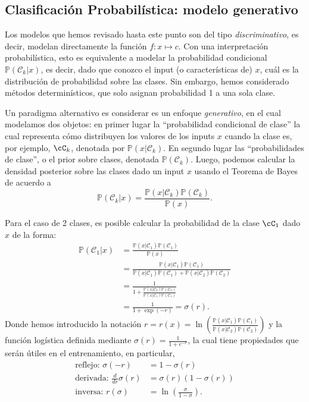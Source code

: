 \subsection{Clasificación Probabilística: modelo generativo}

Los modelos que hemos revisado hasta este punto son del tipo \emph{discriminativo}, es decir, modelan directamente la función $f:x\mapsto c$. Con una interpretación probabilística, esto es equivalente a modelar la probabilidad condicional $\mathbb{P}(\mathcal{C}_k|x)$, es decir, dado que conozco el input (o características de) $x$, cuál es la distribución de probabilidad sobre las clases. Sin embargo, hemos considerado métodos determinísticos, que solo asignan probabilidad 1 a una sola clase. 


Un paradigma alternativo es considerar es un enfoque \emph{generativo}, en el cual modelamos dos  objetos: en primer lugar la ``probabilidad condicional de clase'' la cual representa cómo distribuyen los valores de los inputs $x$ cuando la  clase es, por  ejemplo, $\cC_k$, denotada por $\mathbb{P}(x|\mathcal{C}_k)$. En segundo lugar las ``probabilidades de clase'', o el prior sobre clases, denotada $\mathbb{P}(\mathcal{C}_k)$. Luego, podemos calcular la densidad posterior sobre las clases dado un input $x$ usando el Teorema de Bayes de acuerdo a 
\begin{equation}
	\mathbb{P}(\mathcal{C}_k|x) = \frac{\mathbb{P}(x|\mathcal{C}_k)\mathbb{P}(\mathcal{C}_k)}{\mathbb{P}(x)}.
\end{equation}

Para el caso de 2 clases, es posible calcular la probabilidad de la clase $\cC_1$ dado $x$ de la forma:
\begin{align}
	\mathbb{P}(\mathcal{C}_1|x) 
	&= \frac{\mathbb{P}(x|\mathcal{C}_1)\mathbb{P}(\mathcal{C}_1)}{\mathbb{P}(x)}\nonumber\\
	&= \frac{\mathbb{P}(x|\mathcal{C}_1)\mathbb{P}(\mathcal{C}_1)}{\mathbb{P}(x|\mathcal{C}_1)\mathbb{P}(\mathcal{C}_1)+\mathbb{P}(x|\mathcal{C}_2)\mathbb{P}(\mathcal{C}_2)}\nonumber\\
	&=\frac{1}{1+\frac{\mathbb{P}(x|\mathcal{C}_2)\mathbb{P}(\mathcal{C}_2)}{\mathbb{P}(x|\mathcal{C}_1)\mathbb{P}(\mathcal{C}_1)}}\nonumber\\
	&=\frac{1}{1+\exp(-r)} = \sigma(r).\label{eq:logistic1}
\end{align}
Donde hemos introducido la notación $r = r(x) =\ln\left(\frac{\mathbb{P}(x|\mathcal{C}_1)\mathbb{P}(\mathcal{C}_1)}{\mathbb{P}(x|\mathcal{C}_2)\mathbb{P}(\mathcal{C}_2)}\right)$  y la  función logística definida mediante $\sigma(r) = \frac{1}{1+e^{-r}}$, la cual  tiene propiedades que serán útiles en el entrenamiento, en particular, 
\begin{align}
	\text{reflejo: }\sigma(-r)&=1-\sigma(r)\\
	\text{derivada: }\frac{d}{dr}\sigma(r)&=\sigma(r)(1-\sigma(r))\\
	\text{inversa: }r(\sigma)&=\ln\left(\frac{\sigma}{1-\sigma}\right).
\end{align}


